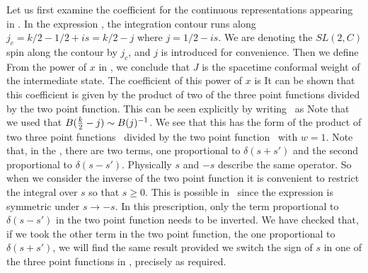 Let us first examine the coefficient for the continuous representations
appearing in \whatrone .
In the expression \whatrone , the integration contour runs along
$j_c = k/2 -1/2 + is = k/2 -  j$ where $ j = 1/2 - is$.
We are denoting the $SL(2,C)$ spin along the contour
by $j_c$, and $j$ is introduced for convenience.
Then we define
\eqn{}
{}From the power of $x$ in \whatrone , we conclude that $J$ is the
spacetime conformal weight of the intermediate state. The
coefficient of this power of $x$ is \whatrone
\eqn{}
It can be shown that this coefficient is given by the product
of two of the three point functions divided by the two point function.
This can be seen explicitly by writing \coeff\ as
\eqn{}
Note that we used that $B({k \over 2} -j) \sim B(j)^{-1} $.
We see that this has the form of the product of two three point
functions \threepx\ divided by the two point function  \correcont\
with $w=1$.
Note that, in the \correcont , there are two terms, one proportional to
$\delta(s+s')$ and the second proportional to $\delta(s-s')$.
Physically $s$ and $-s$ describe the same operator. So when we
consider the inverse of the two point function it is convenient to
restrict the integral over $s$ so that $s\geq 0$. This is
possible in \whatrone\ since the expression is symmetric under
$s \to -s$. In this prescription,
 only the term proportional to $\delta(s-s')$
in the two point function needs to be inverted.
We have checked that,
 if we took the other term in the
two point function, the one proportional to $\delta(s+s')$,
we will find the same result provided we switch the
sign of $s$ in one of the three point functions  in \coeffmex , precisely
as required.






